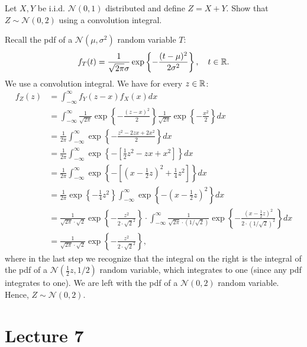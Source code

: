 \begin{exercise}
Let $X,Y$ be i.i.d. $\mathcal{N}(0,1)$ distributed and define $Z = X + Y$. Show that $Z \sim \mathcal{N}(0,2)$ using a convolution integral.

\begin{solution}
Recall the pdf of a $\mathcal{N}(\mu,\sigma^2)$ random variable $T$:
\begin{align}
    f_T(t) = \frac{1}{\sqrt{2\pi}\sigma} \exp\left\{-\frac{(t-\mu)^2}{2 \sigma^2}\right\}, \quad t \in \mathbb{R}.
\end{align}
We use a convolution integral. We have for every $z \in \mathbb{R}$:
\begin{align}
    f_Z(z) &= \int_{-\infty}^\infty f_Y(z - x) f_X(x) dx \\
    &= \int_{-\infty}^\infty \frac{1}{\sqrt{2\pi}} \exp\left\{-\frac{(z - x)^2}{2}\right\} \frac{1}{\sqrt{2\pi}} \exp\left\{-\frac{x^2}{2 }\right\} dx \\
    &= \frac{1}{2\pi} \int_{-\infty}^\infty  \exp\left\{-\frac{z^2 - 2zx + 2 x^2}{2}\right\} dx \\
    &= \frac{1}{2\pi} \int_{-\infty}^\infty  \exp\left\{-\left[\frac{1}{2}z^2 - zx +  x^2\right]\right\} dx \\
    &= \frac{1}{2\pi} \int_{-\infty}^\infty  \exp\left\{-\left[\left(x - \frac{1}{2}z\right)^2 + \frac{1}{4}z^2\right]\right\} dx \\
    &= \frac{1}{2\pi} \exp\left\{-\frac{1}{4}z^2\right\} \int_{-\infty}^\infty  \exp\left\{-\left(x - \frac{1}{2}z\right)^2\right\} dx \\
    &= \frac{1}{\sqrt{2\pi} \cdot \sqrt{2}} \exp\left\{-\frac{z^2}{2 \cdot \sqrt{2}^2}\right\} \cdot \int_{-\infty}^\infty  \frac{1}{\sqrt{2\pi} \cdot (1/\sqrt{2})} \exp\left\{-\frac{\left(x - \tfrac{1}{2}z\right)^2}{2 \cdot (1/\sqrt{2})^2}\right\} dx \\
    &= \frac{1}{\sqrt{2\pi} \cdot \sqrt{2}} \exp\left\{-\frac{z^2}{2 \cdot \sqrt{2}^2}\right\},
\end{align}
where in the last step we recognize that the integral on the right is the integral of the pdf of a $\mathcal{N}(\tfrac{1}{2}z, 1/2)$ random variable, which integrates to one (since any pdf integrates to one). We are left with the pdf of a $\mathcal{N}(0,2)$ random variable. Hence, $Z \sim \mathcal{N}(0,2)$.
\end{solution}
\end{exercise}




\section{Lecture 7}
\label{sec:lecture-7}

